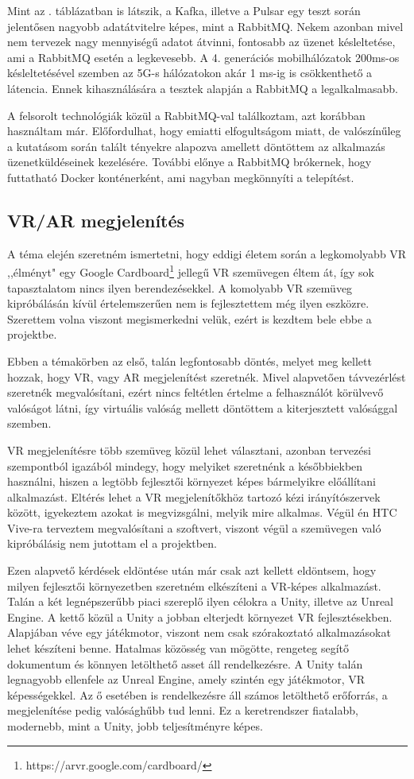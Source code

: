 \documentclass[11pt,a4paper,oneside]{article}
\begin{document}
Mint az . táblázatban is látszik, a Kafka, illetve a Pulsar egy teszt során jelentősen nagyobb adatátvitelre képes, mint a RabbitMQ. Nekem azonban mivel nem tervezek nagy mennyiségű adatot átvinni, fontosabb az üzenet késleltetése, ami a RabbitMQ esetén a legkevesebb. A 4. generációs mobilhálózatok 200ms-os késleltetésével szemben az 5G-s hálózatokon akár 1 ms-ig is csökkenthető a látencia. Ennek kihasználására a tesztek alapján a RabbitMQ a legalkalmasabb.

A felsorolt technológiák közül a RabbitMQ-val találkoztam, azt korábban használtam már. Előfordulhat, hogy emiatti elfogultságom miatt, de valószínűleg a kutatásom során talált tényekre alapozva amellett döntöttem az alkalmazás üzenetküldéseinek kezelésére. További előnye a RabbitMQ brókernek, hogy futtatható Docker konténerként, ami nagyban megkönnyíti a telepítést.

\subsection{VR/AR megjelenítés}

A téma elején szeretném ismertetni, hogy eddigi életem során a legkomolyabb VR ,,élményt" egy Google Cardboard\footnote{https://arvr.google.com/cardboard/} jellegű VR szemüvegen éltem át, így sok tapasztalatom nincs ilyen berendezésekkel. A komolyabb VR szemüveg kipróbálásán kívül értelemszerűen nem is fejlesztettem még ilyen eszközre. Szerettem volna viszont megismerkedni velük, ezért is kezdtem bele ebbe a projektbe.

Ebben a témakörben az első, talán legfontosabb döntés, melyet meg kellett hozzak, hogy VR, vagy AR megjelenítést szeretnék. Mivel alapvetően távvezérlést szeretnék megvalósítani, ezért nincs feltétlen értelme a felhasználót körülvevő valóságot látni, így virtuális valóság mellett döntöttem a kiterjesztett valósággal szemben.

VR megjelenítésre több szemüveg közül lehet választani, azonban tervezési szempontból igazából mindegy, hogy melyiket szeretnénk a későbbiekben használni, hiszen a legtöbb fejlesztői környezet képes bármelyikre előállítani alkalmazást. Eltérés lehet a VR megjelenítőkhöz tartozó kézi irányítószervek között, igyekeztem azokat is megvizsgálni, melyik mire alkalmas. Végül én HTC Vive-ra terveztem megvalósítani a szoftvert, viszont végül a szemüvegen való kipróbálásig nem jutottam el a projektben.

Ezen alapvető kérdések eldöntése után már csak azt kellett eldöntsem, hogy milyen fejlesztői környezetben szeretném elkészíteni a VR-képes alkalmazást. Talán a két legnépszerűbb piaci szereplő ilyen célokra a Unity, illetve az Unreal Engine. A kettő közül a Unity a jobban elterjedt környezet VR fejlesztésekben. Alapjában véve egy játékmotor, viszont nem csak szórakoztató alkalmazásokat lehet készíteni benne. Hatalmas közösség van mögötte, rengeteg segítő dokumentum és könnyen letölthető asset áll rendelkezésre. A Unity talán legnagyobb ellenfele az Unreal Engine, amely szintén egy játékmotor, VR képességekkel. Az ő esetében is rendelkezésre áll számos letölthető erőforrás, a megjelenítése pedig valósághűbb tud lenni. Ez a keretrendszer fiatalabb, modernebb, mint a Unity, jobb teljesítményre képes.
\end{document}
